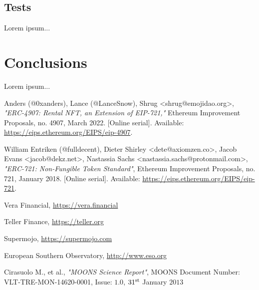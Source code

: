 \documentclass[english, LaM, oneside]{sapthesis}%
\begin{document}
\section{Tests}
\label{sec:moons}
Lorem ipsum...



\chapter{Conclusions}
Lorem ipsum...

\backmatter
{}
\begin{thebibliography}{17}

Anders (@0xanders), Lance (@LanceSnow), Shrug <shrug@emojidao.org>, \textit{"ERC-4907: Rental NFT, an Extension of EIP-721,"} Ethereum Improvement Proposals, no. 4907, March 2022. [Online serial]. Available: \url{https://eips.ethereum.org/EIPS/eip-4907}.

William Entriken (@fulldecent), Dieter Shirley <dete@axiomzen.co>, Jacob Evans <jacob@dekz.net>, Nastassia Sachs <nastassia.sachs@protonmail.com>, \textit{"ERC-721: Non-Fungible Token Standard"}, Ethereum Improvement Proposals, no. 721, January 2018. [Online serial]. Available: \url{https://eips.ethereum.org/EIPS/eip-721}.

Vera Financial, \url{https://vera.financial}

Teller Finance, \url{https://teller.org}

Supermojo, \url{https://supermojo.com}

European Southern Observatory, \url{http://www.eso.org}

Cirasuolo M., et al., \textit{"MOONS Science Report"}, MOONS Document Number: VLT-TRE-MON-14620-0001, Issue: $1.0$, $31^{\textup{st}}$ January $2013$


\end{thebibliography}
\end{document}
